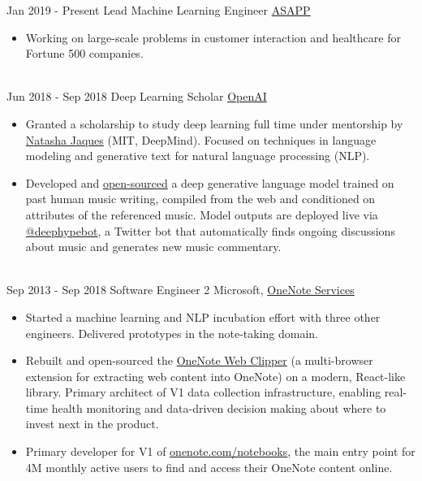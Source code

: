 \documentclass[letterpaper]{twentysecondcv} %
\begin{document}
\begin{twenty} %
    \twentyitem
    	{Jan 2019 -}
		{Present}
        {Lead Machine Learning Engineer}
        {\href{https://www.asapp.com/}{ASAPP}}
        {}
        {
        {\begin{itemize} \itemsep -2pt %
        \item Working on large-scale problems in customer interaction and healthcare for Fortune 500 companies.
        \end{itemize}}
        }
    \\
    \twentyitem
    	{Jun 2018 -}
		{Sep 2018}
        {Deep Learning Scholar}
        {\href{https://blog.openai.com/openai-scholars/}{OpenAI}}
        {}
        {
        {\begin{itemize} \itemsep -2pt %
        \item Granted a scholarship to study deep learning full time under mentorship by \href{https://www.linkedin.com/in/natashajaques}{Natasha Jaques} (MIT, DeepMind). Focused on techniques in language modeling and generative text for natural language processing (NLP).
        \item Developed and \href{https://github.com/iconix/deephypebot}{open-sourced} a deep generative language model trained on past human music writing, compiled from the web and conditioned on attributes of the referenced music. Model outputs are deployed live via \href{https://twitter.com/deephypebot}{@deephypebot}, a Twitter bot that automatically finds ongoing discussions about music and generates new music commentary.
        \end{itemize}}
        }
    \\
    \twentyitem
    	{Sep 2013 -}
		{Sep 2018}
        {Software Engineer 2}
        {Microsoft, \href{http://www.onenote.com/}{OneNote Services}}
        {}
        {
        {\begin{itemize} \itemsep -2pt %
        \item Started a machine learning and NLP incubation effort with three other engineers. Delivered prototypes in the note-taking domain.
        \item Rebuilt and open-sourced the \href{https://github.com/OneNoteDev/WebClipper}{OneNote Web Clipper} (a multi-browser extension for extracting web content into OneNote) on a modern, React-like library. Primary architect of V1 data collection infrastructure, enabling real-time health monitoring and data-driven decision making about where to invest next in the product.
        \item Primary developer for V1 of \href{https://www.onenote.com/notebooks}{onenote.com/notebooks}, the main entry point for 4M monthly active users to find and access their OneNote content online.
        \end{itemize}}
        }

\end{twenty}
\end{document}
